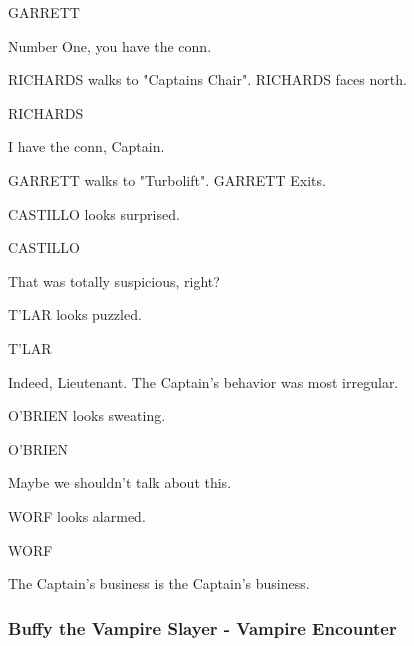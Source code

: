 \documentclass[11pt,letterpaper,oldstylefigures]{memoir}
\newcommand{\speaker}[1]{\nobreak\hspace*{0.333\textwidth}\MakeUppercase{#1}\par\nobreak\vspace{0.5\baselineskip}}
\newcommand{\dialogue}[1]{\nobreak\hspace*{0.25\textwidth}\begin{minipage}{0.5\textwidth}#1\end{minipage}\par\vspace{1\baselineskip}}
\newcommand{\stagedir}[1]{#1\par\vspace{1\baselineskip}}
\newenvironment{FountainExample}
  {\begingroup
  \ttfamily\small
   \setlength{\parindent}{0pt}
  \setlength{\parskip}{0.5em}
  \allowdisplaybreaks
  \setlength{\displaywidowpenalty}{0}
  \setlength{\widowpenalty}{0}
  \setlength{\clubpenalty}{0}
  \setlength{\interlinepenalty}{0}
}
  {\endgroup}
\begin{document}
\begin{FountainExample}
\speaker{GARRETT}
\dialogue{Number One, you have the conn.}

\stagedir{RICHARDS walks to "Captains Chair". RICHARDS faces north.}

\speaker{RICHARDS}
\dialogue{I have the conn, Captain.}

\stagedir{GARRETT walks to "Turbolift". GARRETT Exits.}

\stagedir{CASTILLO looks surprised.}

\speaker{CASTILLO}
\dialogue{That was totally suspicious, right?}

\stagedir{T'LAR looks puzzled.}

\speaker{T'LAR}
\dialogue{Indeed, Lieutenant. The Captain's behavior was most irregular.}

\stagedir{O'BRIEN looks sweating.}

\speaker{O'BRIEN}
\dialogue{Maybe we shouldn't talk about this.}

\stagedir{WORF looks alarmed.}

\speaker{WORF}
\dialogue{The Captain's business is the Captain's business.}
\end{FountainExample}

\subsubsection*{Buffy the Vampire Slayer - Vampire Encounter}
\label{ex:buffy-the-vampire-slayer-vampire-encounter}
\end{document}
